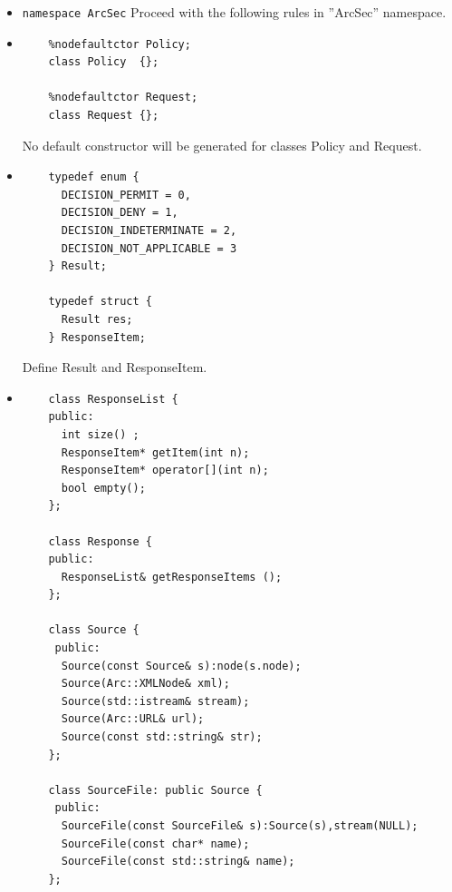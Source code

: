 \documentclass{article}
\begin{document}
\begin{flushleft}
\begin{itemize}
  \item{\verb$namespace ArcSec$} \linebreak
  Proceed with the following rules in ''ArcSec'' namespace.
\end{itemize}
\begin{itemize}
  \item{ \begin{verbatim}
    %nodefaultctor Policy;
    class Policy  {};
    
    %nodefaultctor Request;
    class Request {};
  \end{verbatim}
  No default constructor will be generated for classes Policy and Request.
  }
\end{itemize}
\begin{itemize}
  \item{ \begin{verbatim}
    typedef enum {
      DECISION_PERMIT = 0,
      DECISION_DENY = 1,
      DECISION_INDETERMINATE = 2,
      DECISION_NOT_APPLICABLE = 3
    } Result;
   
    typedef struct {
      Result res;
    } ResponseItem;
  \end{verbatim}
  }
  Define Result and ResponseItem.
\end{itemize}
\begin{itemize}
  \item{ \begin{verbatim}
    class ResponseList {
    public:
      int size() ;
      ResponseItem* getItem(int n);
      ResponseItem* operator[](int n);
      bool empty();
    };
    
    class Response {
    public:
      ResponseList& getResponseItems ();
    };
   
    class Source {
     public:
      Source(const Source& s):node(s.node);
      Source(Arc::XMLNode& xml);
      Source(std::istream& stream);
      Source(Arc::URL& url);
      Source(const std::string& str);
    };

    class SourceFile: public Source {
     public:
      SourceFile(const SourceFile& s):Source(s),stream(NULL);
      SourceFile(const char* name);
      SourceFile(const std::string& name);
    };


\end{verbatim}}
\end{itemize}
\end{flushleft}
\end{document}
